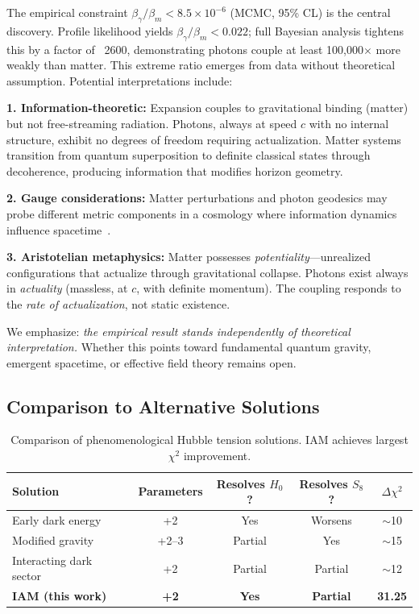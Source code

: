 \documentclass[twocolumn,superscriptaddress,prl,amsmath,amssymb]{revtex4-2}
\begin{document}
The empirical constraint $\beta_\gamma/\beta_m < 8.5 \times 10^{-6}$ (MCMC, 95\% CL) is the central discovery. Profile likelihood yields $\beta_\gamma/\beta_m < 0.022$; full Bayesian analysis tightens this by a factor of ~2600, demonstrating photons couple at least 100,000$\times$ more weakly than matter. This extreme ratio emerges from data without theoretical assumption. Potential interpretations include:

\textbf{1. Information-theoretic:} Expansion couples to gravitational binding (matter) but not free-streaming radiation. Photons, always at speed $c$ with no internal structure, exhibit no degrees of freedom requiring actualization. Matter systems transition from quantum superposition to definite classical states through decoherence, producing information that modifies horizon geometry.

\textbf{2. Gauge considerations:} Matter perturbations and photon geodesics may probe different metric components in a cosmology where information dynamics influence spacetime~\cite{Bardeen1980}.

\textbf{3. Aristotelian metaphysics:} Matter possesses \textit{potentiality}—unrealized configurations that actualize through gravitational collapse. Photons exist always in \textit{actuality} (massless, at $c$, with definite momentum). The coupling responds to the \textit{rate of actualization}, not static existence.

We emphasize: \textit{the empirical result stands independently of theoretical interpretation.} Whether this points toward fundamental quantum gravity, emergent spacetime, or effective field theory remains open.

\subsection{Comparison to Alternative Solutions}

\begin{table}[t]
\centering
\begin{tabular}{lcccc}
\hline\hline
Solution & Parameters & Resolves $H_0$? & Resolves $S_8$? & $\Delta\chi^2$ \\
\hline
Early dark energy~\cite{Kamionkowski2023} & +2 & Yes & Worsens & $\sim$10 \\
Modified gravity~\cite{Amendola2020} & +2--3 & Partial & Yes & $\sim$15 \\
Interacting dark sector~\cite{DiValentino2021} & +2 & Partial & Partial & $\sim$12 \\
\textbf{IAM (this work)} & \textbf{+2} & \textbf{Yes} & \textbf{Partial} & \textbf{31.25} \\
\hline\hline
\end{tabular}
\caption{Comparison of phenomenological Hubble tension solutions. IAM achieves largest $\chi^2$ improvement.}
\end{table}
\end{document}

